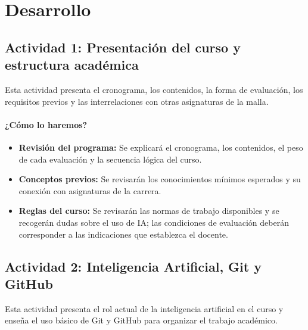 \documentclass[a4,11pt]{aleph-notas}
\begin{document}
\section*{Desarrollo}

\subsection*{Actividad 1: Presentación del curso y estructura académica}

Esta actividad presenta el cronograma, los contenidos, la forma de evaluación, los requisitos previos y las interrelaciones con otras asignaturas de la malla.

\paragraph{¿Cómo lo haremos?}
\begin{itemize}[leftmargin=*]
    \item \textbf{Revisión del programa:} Se explicará el cronograma, los contenidos, el peso de cada evaluación y la secuencia lógica del curso.
    \item \textbf{Conceptos previos:} Se revisarán los conocimientos mínimos esperados y su conexión con asignaturas de la carrera.
    \item \textbf{Reglas del curso:} Se revisarán las normas de trabajo disponibles y se recogerán dudas sobre el uso de IA; las condiciones de evaluación deberán corresponder a las indicaciones que establezca el docente.
\end{itemize}


\subsection*{Actividad 2: Inteligencia Artificial, Git y GitHub}

Esta actividad presenta el rol actual de la inteligencia artificial en el curso y enseña el uso básico de Git y GitHub para organizar el trabajo académico.
\end{document}
